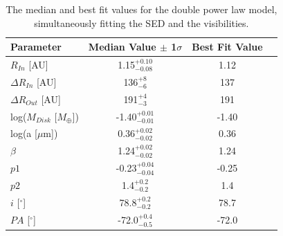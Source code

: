 {{%


\begin{table}
\begin{center}
    \def\arraystretch{1.15}%
    \begin{tabular}{l*{2}{c}r}
    \hline
    Parameter & Median Value $\pm$ 1$\sigma$ & Best Fit Value \\ \hline
     $R_{In}$  [AU] & 1.15$^{+0.10}_{-0.08}$ & 1.12\\  
     $\Delta R_{In}$ [AU] & 136$^{+8}_{-6}$ & 137\\ 
     $\Delta R_{Out}$ [AU] & 191$^{+4}_{-3}$ & 191\\ 
     log($M_{Disk}$ [$M_{\oplus}$]) & -1.40$^{+0.01}_{-0.01}$ & -1.40 \\
     log(a [$\mu$m]) & 0.36$^{+0.02}_{-0.02}$ & 0.36\\ 
     $\beta$ & 1.24$^{+0.02}_{-0.02}$ & 1.24\\ 
     $p1$ & -0.23$^{+0.04}_{-0.04}$ & -0.25\\ 
     $p2$ & 1.4$^{+0.2}_{-0.2}$ & 1.4\\ 
     $i$ [$^\circ$] & 78.8$^{+0.2}_{-0.2}$ & 78.7 \\ 
     $PA$ [$^\circ$] & -72.0$^{+0.4}_{-0.5}$ & -72.0\\
    \hline
    \end{tabular}
\end{center}
\caption{The median and best fit values for the double power law model, simultaneously fitting the SED and the visibilities.} 
\label{tab:doublePowerSEDTable}
\end{table}

}}
